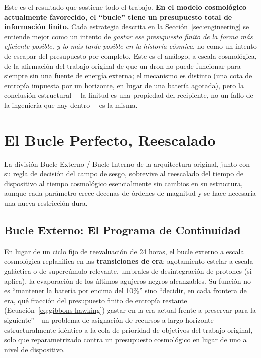 \documentclass[11pt]{article}
\begin{document}
Este es el resultado que sostiene todo el trabajo. \textbf{En el modelo cosmológico actualmente favorecido, el ``bucle'' tiene un presupuesto total de información finito.} Cada estrategia descrita en la Sección~\ref{sec:engineering} se entiende mejor como un intento de \emph{gastar ese presupuesto finito de la forma más eficiente posible, y lo más tarde posible en la historia cósmica}, no como un intento de escapar del presupuesto por completo. Este es el análogo, a escala cosmológica, de la afirmación del trabajo original de que un dron no puede funcionar para siempre sin una fuente de energía externa; el mecanismo es distinto (una cota de entropía impuesta por un horizonte, en lugar de una batería agotada), pero la conclusión estructural —la finitud es una propiedad del recipiente, no un fallo de la ingeniería que hay dentro— es la misma.

\section{El Bucle Perfecto, Reescalado}
\label{sec:architecture}

La división Bucle Externo / Bucle Interno de la arquitectura original, junto con su regla de decisión del campo de sesgo, sobrevive al reescalado del tiempo de dispositivo al tiempo cosmológico esencialmente sin cambios en su estructura, aunque cada parámetro crece decenas de órdenes de magnitud y se hace necesaria una nueva restricción dura.

\subsection{Bucle Externo: El Programa de Continuidad}

En lugar de un ciclo fijo de reevaluación de 24 horas, el bucle externo a escala cosmológica replanifica en las \textbf{transiciones de era}: agotamiento estelar a escala galáctica o de supercúmulo relevante, umbrales de desintegración de protones (si aplica), la evaporación de los últimos agujeros negros alcanzables. Su función no es ``mantener la batería por encima del 10\%'' sino ``decidir, en cada frontera de era, qué fracción del presupuesto finito de entropía restante (Ecuación~\ref{eq:gibbons-hawking}) gastar en la era actual frente a preservar para la siguiente''—un problema de asignación de recursos a largo horizonte estructuralmente idéntico a la cola de prioridad de objetivos del trabajo original, solo que reparametrizado contra un presupuesto cosmológico en lugar de uno a nivel de dispositivo.
\end{document}

